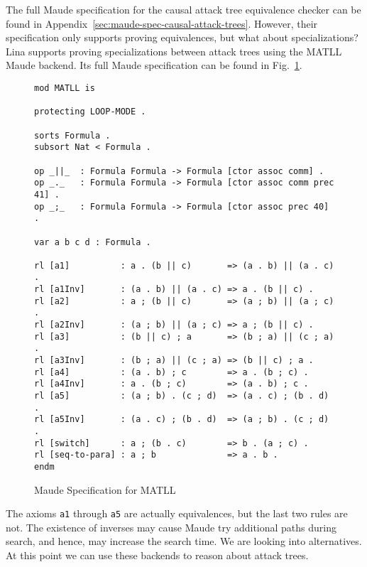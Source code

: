 The full Maude specification for the causal attack tree equivalence
checker can be found in
Appendix~\ref{sec:maude-spec-causal-attack-trees}.  However, their
specification only supports proving equivalences, but what about
specializations?  Lina supports proving specializations between attack
trees using the MATLL Maude backend.  Its full Maude specification can
be found in Fig.~\ref{fig:maude-spec-matll}.
\begin{figure}
\begin{mdframed}
\scriptsize
\begin{verbatim}
mod MATLL is

protecting LOOP-MODE .

sorts Formula .
subsort Nat < Formula .

op _||_  : Formula Formula -> Formula [ctor assoc comm] .
op _._   : Formula Formula -> Formula [ctor assoc comm prec 41] .
op _;_   : Formula Formula -> Formula [ctor assoc prec 40] .

var a b c d : Formula .

rl [a1]          : a . (b || c)       => (a . b) || (a . c) .
rl [a1Inv]       : (a . b) || (a . c) => a . (b || c) .
rl [a2]          : a ; (b || c)       => (a ; b) || (a ; c) .
rl [a2Inv]       : (a ; b) || (a ; c) => a ; (b || c) .
rl [a3]          : (b || c) ; a       => (b ; a) || (c ; a) .
rl [a3Inv]       : (b ; a) || (c ; a) => (b || c) ; a .
rl [a4]          : (a . b) ; c        => a . (b ; c) .
rl [a4Inv]       : a . (b ; c)        => (a . b) ; c .
rl [a5]          : (a ; b) . (c ; d)  => (a . c) ; (b . d) .
rl [a5Inv]       : (a . c) ; (b . d)  => (a ; b) . (c ; d) .
rl [switch]      : a ; (b . c)        => b . (a ; c) .
rl [seq-to-para] : a ; b              => a . b .
endm      
\end{verbatim}
\end{mdframed}
  \caption{Maude Specification for MATLL}
  \label{fig:maude-spec-matll}
\end{figure}
The axioms \verb!a1! through \verb!a5! are actually equivalences, but
the last two rules are not.  The existence of inverses may cause Maude
try additional paths during search, and hence, may increase the search
time.  We are looking into alternatives.  At this point we can use
these backends to reason about attack trees.

